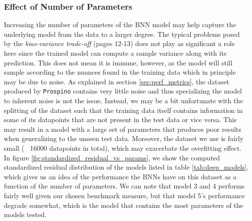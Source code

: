 \subsubsection{Effect of Number of Parameters}
Increasing the number of parameters of the BNN model may help capture the underlying model from the data to a larger degree. The typical problems posed by the \textit{bias-variance trade-off} \cite{ml_for_physicists} (pages 12-13) does not play as significant a role here since the trained model can compute a sample variance along with its prediction. This does not mean it is immune, however, as the model will still sample according to the nuances found in the training data which in principle may be due to noise. As explained in section \ref{sec:perf_metrics}, the dataset produced by {\tt Prospino} contains very little noise and thus specializing the model to inherent noise is not the issue. Instead, we may be a bit unfortunate with the splitting of the dataset such that the training data itself contains information in some of its datapoints that are not present in the test data or vice versa. This may result in a model with a large set of parameters that produces poor results when generalizing to the unseen test data. Moreover, the dataset we use is fairly small (~ 16000 datapoints in total), which may exacerbate the overfitting effect.
In figure \ref{fig:standardized_residual_vs_params}, we show the computed standardized residual distribution of the models listed in table \ref{tab:deep_models}, which gives us an idea of the performance the BNNs have on this dataset as a function of the number of parameters. We can note that model 3 and 4 performs fairly well given our chosen benchmark measure, but that model 5's performance degrade somewhat, which is the model that contains the most parameters of the models tested. 

